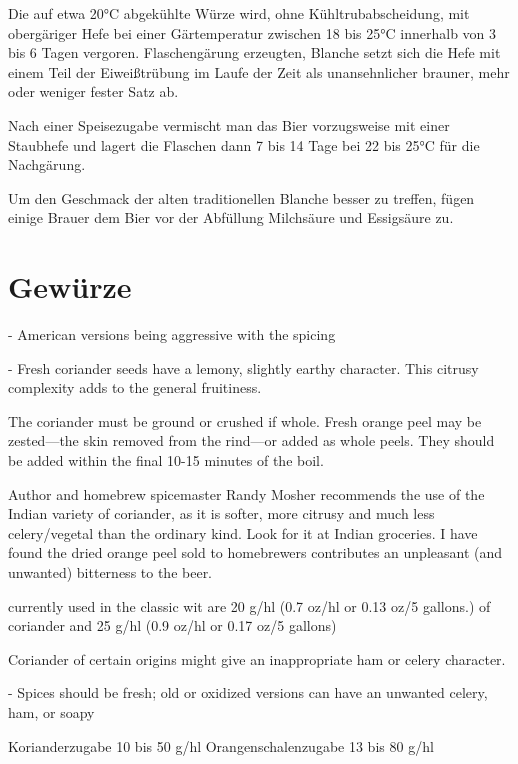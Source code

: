 \documentclass[a4paper,parskip=half]{scrartcl}
\begin{document}
\parencite[18]{Strottner1999}
Die auf etwa 20°C abgekühlte Würze wird, ohne Kühltrubabscheidung, mit
obergäriger Hefe bei einer Gärtemperatur zwischen 18 bis 25°C innerhalb von
3 bis 6 Tagen vergoren. 
Flaschengärung erzeugten, Blanche setzt sich die Hefe mit einem
Teil der Eiweißtrübung im Laufe der Zeit als unansehnlicher brauner, mehr oder
weniger fester Satz ab.

Nach einer Speisezugabe vermischt man das Bier vorzugsweise
mit einer Staubhefe und lagert die Flaschen dann 7 bis 14 Tage bei 22 bis 25°C für
die Nachgärung.

Um den Geschmack der alten traditionellen Blanche besser zu treffen, fügen einige
Brauer dem Bier vor der Abfüllung Milchsäure und Essigsäure zu.



\section*{Gewürze}

\parencite[26]{Strong2021}
- American versions being aggressive with the spicing

- Fresh coriander seeds have a lemony, slightly
earthy character. This citrusy complexity adds to the general
fruitiness.


\parencite[29]{Sparrow2002}
The coriander
must be ground or crushed if whole. Fresh
orange peel may be zested—the skin
removed from the rind—or added as whole
peels. They should be added within the final
10-15 minutes of the boil.

Author and homebrew spicemaster
Randy Mosher recommends the use of the
Indian variety of coriander, as it is softer,
more citrusy and much less celery/vegetal
than the ordinary kind. Look for it at Indian
groceries. I have found the dried orange peel
sold to homebrewers contributes an
unpleasant (and unwanted) bitterness to the
beer.

\parencite[29]{Sparrow2002}
currently used in the classic wit are 20 g/hl
(0.7 oz/hl or 0.13 oz/5 gallons.) of coriander
and 25 g/hl (0.9 oz/hl or 0.17 oz/5 gallons)

\parencite[48]{BJCP2015}
Coriander of certain origins
might give an inappropriate ham or celery character. 

\parencite[26]{Strong2021}
- Spices should be fresh; old or oxidized versions can have an unwanted celery, ham, or soapy

\parencite[13]{Strottner1999}
Korianderzugabe 10 bis 50 g/hl
Orangenschalenzugabe 13 bis 80 g/hl
\end{document}
